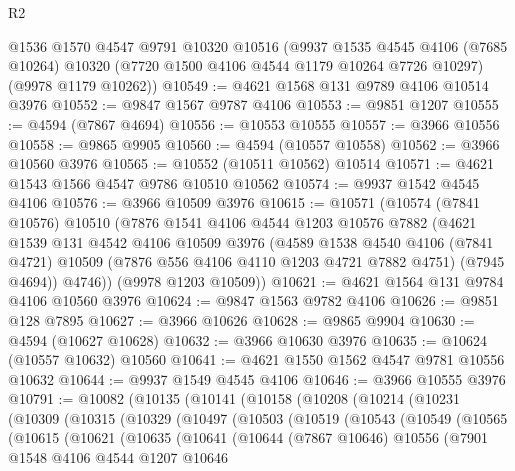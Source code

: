 \begin{lexlean}{R2}
\begin{coremodule}
    @1536
    @1570
    @4547
    @9791
    @10320
    @10516
    (@9937
      @1535
      @4545
      @4106
      (@7685 @10264)
      @10320
      (@7720 @1500 @4106 @4544 @1179 @10264 @7726 @10297)
      (@9978 @1179 @10262))
@10549 := @4621 @1568 @131 @9789 @4106 @10514 @3976
@10552 := @9847 @1567 @9787 @4106
@10553 := @9851 @1207
@10555 := @4594 (@7867 @4694)
@10556 := @10553 @10555
@10557 := @3966 @10556
@10558 := @9865 @9905
@10560 := @4594 (@10557 @10558)
@10562 := @3966 @10560 @3976
@10565 := @10552 (@10511 @10562) @10514
@10571 := @4621 @1543 @1566 @4547 @9786 @10510 @10562
@10574 := @9937 @1542 @4545 @4106
@10576 := @3966 @10509 @3976
@10615 := @10571
    (@10574
      (@7841 @10576)
      @10510
      (@7876
        @1541
        @4106
        @4544
        @1203
        @10576
        @7882
        (@4621
          @1539
          @131
          @4542
          @4106
          @10509
          @3976
          (@4589
            @1538
            @4540
            @4106
            (@7841 @4721)
            @10509
            (@7876 @556 @4106 @4110 @1203 @4721 @7882 @4751)
            (@7945 @4694))
          @4746))
      (@9978 @1203 @10509))
@10621 := @4621 @1564 @131 @9784 @4106 @10560 @3976
@10624 := @9847 @1563 @9782 @4106
@10626 := @9851 @128 @7895
@10627 := @3966 @10626
@10628 := @9865 @9904
@10630 := @4594 (@10627 @10628)
@10632 := @3966 @10630 @3976
@10635 := @10624 (@10557 @10632) @10560
@10641 := @4621 @1550 @1562 @4547 @9781 @10556 @10632
@10644 := @9937 @1549 @4545 @4106
@10646 := @3966 @10555 @3976
@10791 := @10082
    (@10135
      (@10141
        (@10158
          (@10208
            (@10214
              (@10231
                (@10309
                  (@10315
                    (@10329
                      (@10497
                        (@10503
                          (@10519
                            (@10543
                              (@10549
                                (@10565
                                  (@10615
                                    (@10621
                                      (@10635
                                        (@10641
                                          (@10644
                                            (@7867 @10646)
                                            @10556
                                            (@7901
                                              @1548
                                              @4106
                                              @4544
                                              @1207
                                              @10646

\end{coremodule}
\end{lexlean}

